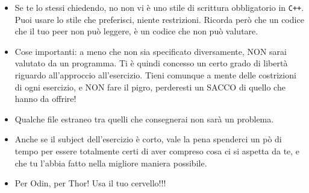 \begin{itemize}
	 \item Se te lo stessi chiedendo, no non vi è uno stile di scrittura obbligatorio in \texttt{C++}. 
	 Puoi usare lo stile che preferisci, niente restrizioni. Ricorda però che un codice
	 che il tuo peer non può leggere, è un codice che non può valutare.
       
       	    \item Cose importanti: a meno che non sia specificato diversamente, 
	    NON sarai valutato da un programma. Ti è quindi concesso un certo 
	    grado di libertà riguardo all'approccio all'esercizio.
	    Tieni comunque a mente delle costrizioni di ogni esercizio, e NON fare il
	    pigro, perderesti un SACCO di quello che hanno da offrire!
	    

		\item Qualche file estraneo tra quelli che consegnerai non sarà un problema.
	
		\item Anche se il subject dell'esercizio è corto, vale la pena spenderci
		un pò di tempo per essere totalmente certi di aver compreso cosa ci si aspetta
		da te, e che tu l'abbia fatto nella migliore maniera possibile.

        \item Per Odin, per Thor! Usa il tuo cervello!!!

\end{itemize}

\newpage
